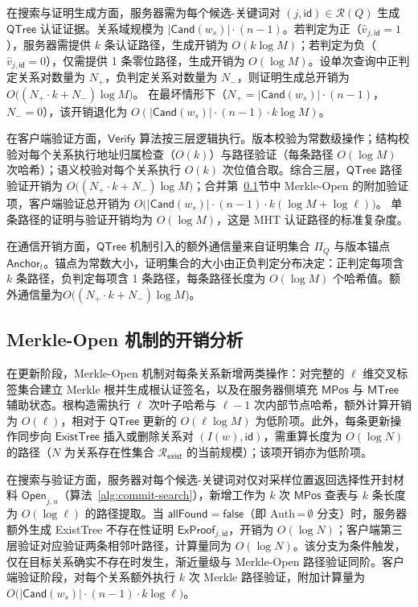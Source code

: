 在搜索与证明生成方面，服务器需为每个候选-关键词对 $(j,\mathsf{id})\in\mathcal{R}(Q)$ 生成 $\mathsf{QTree}$ 认证证据。关系域规模为 $|\mathsf{Cand}(w_s)|\cdot(n-1)$。若判定为正（$\widehat{v}_{j,\mathsf{id}}=1$），服务器需提供 $k$ 条认证路径，生成开销为 $O(k\log M)$；若判定为负（$\widehat{v}_{j,\mathsf{id}}=0$），仅需提供 1 条零位路径，生成开销为 $O(\log M)$。设单次查询中正判定关系对数量为 $N_+$，负判定关系对数量为 $N_-$，则证明生成总开销为$O\bigl((N_+\cdot k + N_-)\log M\bigr)$。
在最坏情形下（$N_+=|\mathsf{Cand}(w_s)|\cdot(n-1)$，$N_-=0$），该开销退化为 $O(|\mathsf{Cand}(w_s)|\cdot(n-1)\cdot k\log M)$。

在客户端验证方面，$\mathsf{Verify}$ 算法按三层逻辑执行。版本校验为常数级操作；结构校验对每个关系执行地址归属检查（$O(k)$）与路径验证（每条路径 $O(\log M)$ 次哈希）；语义校验对每个关系执行 $O(k)$ 次位值合取。综合三层，$\mathsf{QTree}$ 路径验证开销为 $O\bigl((N_+\cdot k + N_-)\log M\bigr)$；合并第~\ref{sec:commit-overhead}节中 Merkle-Open 的附加验证项，客户端验证总开销为 $O\bigl(|\mathsf{Cand}(w_s)|\cdot(n-1)\cdot k(\log M+\log\ell)\bigr)$。
单条路径的证明与验证开销均为 $O(\log M)$，这是 MHT 认证路径的标准复杂度\cite{merkle1982secrecy}。

在通信开销方面，$\mathsf{QTree}$ 机制引入的额外通信量来自证明集合 $\Pi_Q$ 与版本锚点 $\mathsf{Anchor}_t$。锚点为常数大小，证明集合的大小由正负判定分布决定：正判定每项含 $k$ 条路径，负判定每项含 1 条路径，每条路径长度为 $O(\log M)$ 个哈希值。额外通信量为$O\bigl((N_+\cdot k + N_-)\log M\bigr)$。

\subsection{Merkle-Open 机制的开销分析}\label{sec:commit-overhead}

在更新阶段，Merkle-Open 机制对每条关系新增两类操作：对完整的 $\ell$ 维交叉标签集合建立 Merkle 根并生成根认证签名，以及在服务器侧填充 $\mathsf{MPos}$ 与 $\mathsf{MTree}$ 辅助状态。根构造需执行 $\ell$ 次叶子哈希与 $\ell-1$ 次内部节点哈希，额外计算开销为 $O(\ell)$，相对于 $\mathsf{QTree}$ 更新的 $O(\ell\log M)$ 为低阶项。此外，每条更新操作同步向 $\mathsf{ExistTree}$ 插入或删除关系对 $(I(w),\mathsf{id})$，需重算长度为 $O(\log N)$ 的路径（$N$ 为关系存在性集合 $\mathcal{R}_{\mathsf{exist}}$ 的当前规模）；该项开销亦为低阶项。

在搜索与验证方面，服务器对每个候选-关键词对仅对采样位置返回选择性开封材料 $\mathsf{Open}_{j,u}$（算法~\ref{alg:commit-search}），新增工作为 $k$ 次 $\mathsf{MPos}$ 查表与 $k$ 条长度为 $O(\log\ell)$ 的路径提取。当 $\mathsf{allFound}=\mathsf{false}$（即 Auth\,=\,$\emptyset$ 分支）时，服务器额外生成 ExistTree 不存在性证明 $\mathsf{ExProof}_{j,\mathsf{id}}$，开销为 $O(\log N)$；客户端第三层验证对应验证两条相邻叶路径，计算量同为 $O(\log N)$。该分支为条件触发，仅在目标关系确实不存在时发生，渐近量级与 Merkle-Open 路径验证同阶。客户端验证阶段，对每个关系额外执行 $k$ 次 Merkle 路径验证，附加计算量为$O\bigl(|\mathsf{Cand}(w_s)|\cdot(n-1)\cdot k\log\ell\bigr)$。

